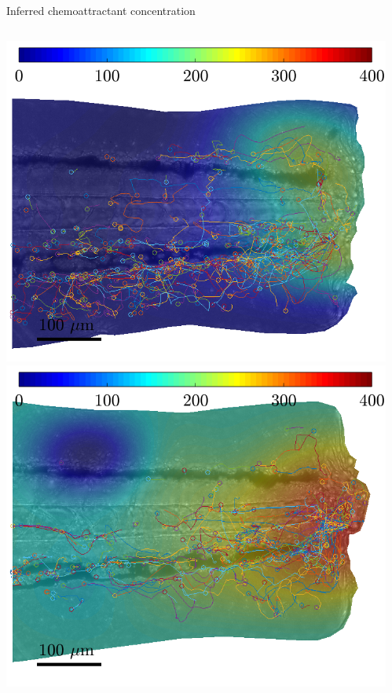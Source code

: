 \documentclass[mathserif,11pt]{beamer}
\begin{document}
\begin{frame}{Inferred chemoattractant concentration}
\begin{columns}
	\begin{column}{0.3\textwidth}
		\includegraphics[scale=0.185]{Figures/s2_ukf_tracks.png}
		\vspace{0.3cm}
		\includegraphics[scale=0.185]{Figures/s3_ukf_tracks.png}
	\end{column}
	\begin{column}{0.3\textwidth}

\end{column}
\end{columns}
\end{frame}
\end{document}
